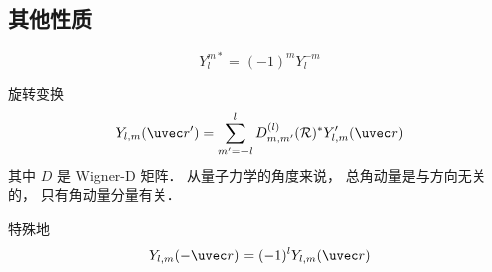 \subsection{其他性质}
\begin{equation}
Y_l^{m*} = (-1)^m Y_l^{-m}
\end{equation}

旋转变换
\begin{equation}
Y_{l,m}(\uvec r') = \sum_{m'=-l}^l D_{m,m'}^{(l)} (\mathcal R)^* Y_{l,m}'(\uvec r)
\end{equation}
其中 $D$ 是 Wigner-D 矩阵． 从量子力学的角度来说， 总角动量是与方向无关的， 只有角动量分量有关．

特殊地
\begin{equation}
Y_{l,m}(-\uvec r) = (-1)^l Y_{l,m}(\uvec r)
\end{equation}
